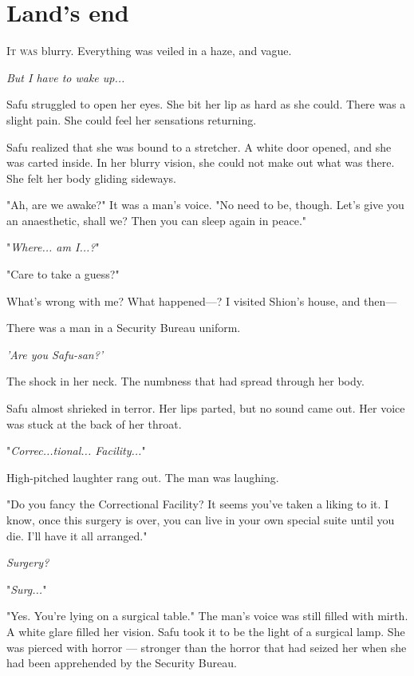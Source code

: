 
\chapter{Land's end}


\lettrine{I}{t was} blurry. Everything was veiled in a haze, and vague.

\emph{But I have to wake up...}

Safu struggled to open her eyes. She bit her lip as hard as she could.
There was a slight pain. She could feel her sensations returning.

Safu realized that she was bound to a stretcher. A white door opened,
and she was carted inside. In her blurry vision, she could not make out
what was there. She felt her body gliding sideways.

"Ah, are we awake?" It was a man's voice. "No need to be, though. Let's
give you an anaesthetic, shall we? Then you can sleep again in peace."

"\emph{Where... am I...?}"

"Care to take a guess?"

What's wrong with me? What happened---? I visited Shion's house, and then---

There was a man in a Security Bureau uniform.

\emph{'Are you Safu-san?'}

The shock in her neck. The numbness that had spread through her body.

Safu almost shrieked in terror. Her lips parted, but no sound came out.
Her voice was stuck at the back of her throat.

"\emph{Correc...tional... Facility...}"

High-pitched laughter rang out. The man was laughing.

"Do you fancy the Correctional Facility? It seems you've taken a liking
to it. I know, once this surgery is over, you can live in your own
special suite until you die. I'll have it all arranged."

\emph{Surgery?}

"\emph{Surg...}"

"Yes. You're lying on a surgical table." The man's voice was still
filled with mirth. A white glare filled her vision. Safu took it to be
the light of a surgical lamp. She was pierced with horror --- stronger
than the horror that had seized her when she had been apprehended by the
Security Bureau.

